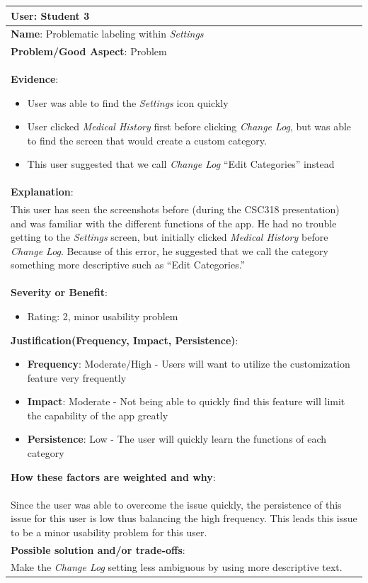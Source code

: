 \documentclass[pdftex,12pt,a4paper]{report}
\begin{document}
\begin{center}
	\begin{tabular}{|p{\textwidth}|}
	\hline
	\textbf{User}: Student 3\\
	\hline
	\textbf{Name}: Problematic labeling within \emph{Settings}\\
	\hline
	\textbf{Problem/Good Aspect}: Problem\\
	\hline
	\textbf{Evidence}:
	\begin{itemize}
	\item{User was able to find the \emph{Settings} icon quickly}
	\item{User clicked \emph{Medical History} first before clicking \emph{Change Log}, but was able to find the screen that would create a custom category.}
	\item{This user suggested that we call \emph{Change Log} ``Edit Categories'' instead}
	\end{itemize}\\
	\hline
	\textbf{Explanation}:\\This user has seen the screenshots before (during the CSC318 presentation) and was familiar with the different functions of the app. He had no trouble getting to the \emph{Settings} screen, but initially clicked \emph{Medical History} before \emph{Change Log}. Because of this error, he suggested that we call the category something more descriptive such as ``Edit Categories.''\\
	\hline
\textbf{Severity or Benefit}:
	\begin{itemize}
	\item{Rating: 2, minor usability problem}
	\end{itemize}
	\textbf{Justification(Frequency, Impact, Persistence)}:
	\begin{itemize}
	\item{\textbf{Frequency}:} Moderate/High - Users will want to utilize the customization feature very frequently
	\item{\textbf{Impact}:} Moderate - Not being able to quickly find this feature will limit the capability of the app greatly
	\item{\textbf{Persistence}:} Low - The user will quickly learn the functions of each category
	\end{itemize}
	\textbf{How these factors are weighted and why}:\\
	Since the user was able to overcome the issue quickly, the persistence of this issue for this user is low thus balancing the high frequency. This leads this issue to be a minor usability problem for this user.\\
	\hline
	\textbf{Possible solution and/or trade-offs}:\\
	Make the \emph{Change Log} setting less ambiguous by using more descriptive text.\\
	\hline
	\end{tabular}
\end{center}
\end{document}
